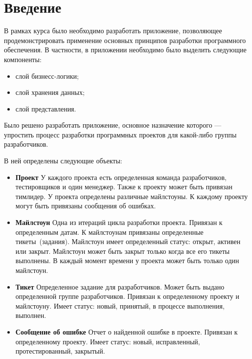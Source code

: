 \section{Введение}
В рамках курса было необходимо разработать приложение, позволяющее 
продемонстрировать применение основных принципов разработки программного 
обеспечения.
В частности, в приложении необходимо было выделить следующие компоненты:
\begin{itemize}
\item слой бизнесс-логики;
\item слой хранения данных;
\item слой представления.
\end{itemize}
Было решено разработать приложение, основное назначение которого --- упростить процесс разработки программных проектов для какой-либо группы разработчиков.

В ней определены следующие объекты:
\begin{itemize}
	\item \textbf{Проект} У каждого проекта есть определенная команда разработчиков, тестировщиков и один менеджер. Также к проекту может быть привязан тимлидер. У проекта определены различные майлстоуны. К каждому проекту могут быть привязаны сообщения об ошибках.
	
	\item \textbf{Майлстоун} Одна из итераций цикла разработки проекта. Привязан к определенным датам. К майлстоунам привязаны определенные тикеты~(задания). Майлстоун имеет определенный статус: открыт, активен или закрыт. Майлстоун может быть закрыт только когда все его тикеты выполнены. В каждый момент времени у проекта может быть только один майлстоун.
	
	\item \textbf{Тикет} Определенное задание для разработчиков. Может быть выдано определенной группе разработчиков. Привязан к определенному проекту и майлстоуну. Имеет статус: новый, принятый, в процессе выполнения, выполнен.
	
	\item \textbf{Сообщение об ошибке} Отчет о найденной ошибке в проекте. Привязан к определенному проекту. Имеет статус: новый, исправленный, протестированный, закрытый.
\end{itemize}